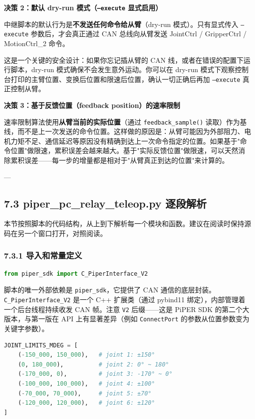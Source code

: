 \documentclass[UTF8,a4paper,11pt]{ctexart}
\begin{document}
{\textbf{决策 2：默认 dry-run 模式（\texttt{--execute} 显式启用）}

中继脚本的默认行为是\textbf{不发送任何命令给从臂}（dry-run 模式）。只有显式传入 \texttt{--execute} 参数后，才会真正通过 CAN 总线向从臂发送 JointCtrl / GripperCtrl / MotionCtrl_2 命令。

这是一个关键的安全设计：如果你忘记插从臂的 CAN 线，或者在错误的配置下运行脚本，dry-run 模式确保不会发生意外运动。你可以在 dry-run 模式下观察控制台打印的主臂位置、变换后位置和限速后位置，确认一切正确后再加 \texttt{--execute} 真正控制从臂。

\textbf{决策 3：基于反馈位置（feedback position）的速率限制}

速率限制算法使用\textbf{从臂当前的实际位置}（通过 \texttt{feedback_sample()} 读取）作为基线，而不是上一次发送的命令位置。这样做的原因是：从臂可能因为外部阻力、电机力矩不足、通信延迟等原因没有精确到达上一次命令指定的位置。如果基于"命令位置"做限速，累积误差会越来越大。基于"实际反馈位置"做限速，可以天然消除累积误差——每一步的增量都是相对于"从臂真正到达的位置"来计算的。

---

\subsection{7.3 piper_pc_relay_teleop.py 逐段解析}

本节按照脚本的代码结构，从上到下解析每一个模块和函数。建议在阅读时保持源码在另一个窗口打开，对照阅读。

\subsubsection{7.3.1 导入和常量定义}

\begin{lstlisting}[language=python]
from piper_sdk import C_PiperInterface_V2
\end{lstlisting}

脚本的唯一外部依赖是 \texttt{piper_sdk}，它提供了 CAN 通信的底层封装。\texttt{C_PiperInterface_V2} 是一个 C++ 扩展类（通过 pybind11 绑定），内部管理着一个后台线程持续收发 CAN 帧。注意 \texttt{V2} 后缀——这是 PiPER SDK 的第二个大版本，与第一版在 API 上有显著差异（例如 \texttt{ConnectPort} 的参数从位置参数变为关键字参数）。

\begin{lstlisting}[language=python]
JOINT_LIMITS_MDEG = [
    (-150_000, 150_000),   # joint 1: ±150°
    (0, 180_000),          # joint 2: 0° ~ 180°
    (-170_000, 0),         # joint 3: -170° ~ 0°
    (-100_000, 100_000),   # joint 4: ±100°
    (-70_000, 70_000),     # joint 5: ±70°
    (-120_000, 120_000),   # joint 6: ±120°
]


\end{lstlisting}}
\end{document}
